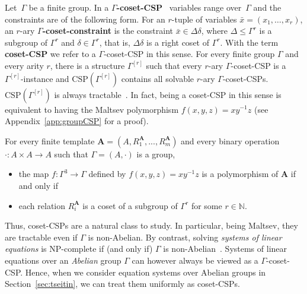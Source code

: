 \documentclass[a4paper,english, thm-restate]{lipics-v2021}
\newcommand{\defining}[1]{\textbf{#1}}
\newcommand{\tup}[1]{\bar{#1}}
\newcommand{\StructA}{\mathbf{A}}
\newcommand{\CSP}[1]{\mathrm{CSP}(#1)}
\newcommand{\bbN}{\mathbb{N}}
\newcommand{\CosetGrpTmplt}[2]{#1^{[#2]}}
\begin{document}
	
	Let~$\Gamma$ be a finite group.
	In a \defining{$\Gamma$-coset-CSP}~\cite{BerkholzGrohe2015, feder1993monotone} variables range over~$\Gamma$ and the constraints are of the following form. 
	For an $r$-tuple of variables ${\tup{x} = (x_1, \dots, x_r)}$,
	an $r$-ary \defining{$\Gamma$-coset-constraint} is the constraint
	$\tup{x} \in \Delta\delta$, where $\Delta \leq \Gamma^r$ is a subgroup
	of $\Gamma^r$ and $\delta \in \Gamma^r$, that is,  $\Delta\delta$ is a right coset of $\Gamma^r$.
	With the term \defining{coset-CSP} we refer to a $\Gamma$-coset-CSP in this sense.
	For every finite group $\Gamma$ and every arity $r$, there is a structure $\CosetGrpTmplt{\Gamma}{r}$ such that every $r$-ary $\Gamma$-coset-CSP
	is a $\CosetGrpTmplt{\Gamma}{r}$-instance
	and $\CSP{\CosetGrpTmplt{\Gamma}{r}}$ contains all solvable $r$-ary $\Gamma$-coset-CSPs.
	$\CSP{\CosetGrpTmplt{\Gamma}{r}}$ is always tractable~\cite{feder1993monotone}.
	In fact, being a coset-CSP in this sense is equivalent to having the Maltsev polymorphism $f(x,y,z) = xy^{-1}z$
	(see Appendix~\ref{app:groupCSP} for a proof).
	\begin{lemma}[restate=groupCSPMaltsev, name=]
		\label{lem:group-csp-maltsev}
		For every finite template $\StructA = (A, R_1^\StructA,...,R_m^\StructA)$
		and every binary operation $\cdot \colon A \times A \to A$ such that $\Gamma = (A,\cdot)$ is a group,
		\begin{itemize}
			\item  the map $f: \Gamma^3 \to \Gamma$ defined by $f(x,y,z) = xy^{-1}z$ is a polymorphism of $\StructA$ if and only if 
			\item  each relation $R_i^{\StructA}$ is a coset of a subgroup of $\Gamma^r$ for some $r \in \bbN$.
		\end{itemize}	
	\end{lemma}	
	Thus, coset-CSPs are a natural class to study. In particular, being Maltsev, they are tractable even if $\Gamma$ is non-Abelian.
	By contrast, solving \emph{systems of linear equations} is NP-complete if (and only if) $\Gamma$ is non-Abelian~\cite{GOLDMANN}.
	Systems of linear equations over an \emph{Abelian} group $\Gamma$
	can however always be viewed as a $\Gamma$-coset-CSP.
	Hence, when we consider equation systems over Abelian groups in Section~\ref{sec:tseitin}, we can treat them uniformly as coset-CSPs.


	
	
	
\end{document}
